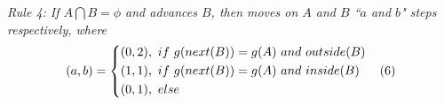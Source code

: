 \sstab \emph{Rule 4:
If $A \bigcap B = \phi$ and advances $B$, then moves on $A$ and $B$ ``$a$ and $b$" steps respectively, where}
\vspace{-1ex}
\begin{equation*}
\label{equ-rule4}
\small
    \hspace{0ex} (a,b) =  \left\{
    \begin{aligned}
        & (0,2), ~if~ g(next(B)) = g(A) ~and~ outside(B)\\
        & (1,1), ~if~ g(next(B)) = g(A) ~and~ inside(B)\\
        & (0,1), ~else
    \end{aligned}
    \right.       \hspace{2ex}(6)
\end{equation*}
\vspace{-1ex}



